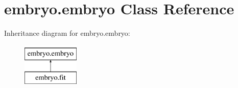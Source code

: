 \hypertarget{classembryo_1_1embryo}{\section{embryo.\+embryo Class Reference}
\label{classembryo_1_1embryo}
}
Inheritance diagram for embryo.\+embryo\+:\begin{figure}[H]
\begin{center}
\leavevmode
\includegraphics[height=2.000000cm]{classembryo_1_1embryo}
\end{center}
\end{figure}
